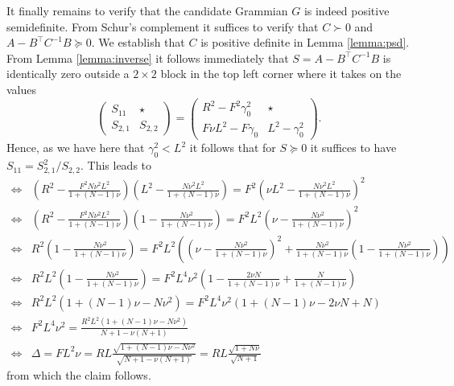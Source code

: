 \documentclass{article}
\begin{document}
\begin{appendixproof}
It finally remains to verify that the candidate Grammian $G$ is indeed positive semidefinite. From Schur's complement it suffices to verify that $C\succ 0$ and $A-B^\top C^{-1} B\succeq 0$. We establish that $C$ is positive definite in Lemma \ref{lemma:psd}. From Lemma \ref{lemma:inverse} it follows immediately that $S = A-B^\top C^{-1} B$ is identically zero outside a $2\times2$ block in the top left corner where it takes on the values
\[
  \begin{pmatrix}
    S_{11} & \star \\
    S_{2, 1} & S_{2,2}
  \end{pmatrix}
  =
  \begin{pmatrix}
    R^2-F^2\gamma_0^2 & \star \\
    F\nu L^2-F\gamma_0 & L^2-\gamma_0^2
  \end{pmatrix}.
\]
Hence, as we have here that $\gamma_0^2<L^2$ it follows that for $S\succeq 0$ it suffices to have $S_{11} = S_{2,1}^2/S_{2,2}$. This leads to
\begin{align*}
  \iff & \left(R^2-\frac{F^2 N \nu^2 L^2}{1+(N-1)\nu}\right)\left(L^2-\frac{N \nu^2 L^2}{1+(N-1)\nu}\right)=F^2 \left( \nu L^2-\frac{N \nu^2 L^2}{1+(N-1)\nu}\right)^2\\
  \iff & \left(R^2-\frac{F^2 N \nu^2 L^2}{1+(N-1)\nu}\right)\left(1-\frac{N \nu^2}{1+(N-1)\nu}\right)=F^2 L^2 \left( \nu -\frac{N \nu^2}{1+(N-1)\nu}\right)^2\\
  \iff &  R^2 \left(1-\frac{N \nu^2}{1+(N-1)\nu}\right)=F^2 L^2 \left(  \left( \nu -\frac{N \nu^2}{1+(N-1)\nu}\right)^2 + \frac{N \nu^2 }{1+(N-1)\nu} \left(1-\frac{N \nu^2}{1+(N-1)\nu}\right) \right)\\
  \iff & R^2 L^2 \left(1-\frac{N \nu^2}{1+(N-1)\nu}\right)=F^2 L^4 \nu^2 \left( 1-\frac{2\nu N}{1+(N-1)\nu}+\frac{N}{1+(N-1)\nu} \right)\\
  \iff & R^2 L^2 \left(1+(N-1)\nu-N \nu^2\right)=F^2 L^4 \nu^2 \left( 1+(N-1)\nu-2\nu N+N \right)\\
  \iff & F^2 L^4 \nu^2 = \frac{R^2L^2 \left(1+(N-1)\nu-N \nu^2\right)}{N+1-\nu(N+1)}\\
  \iff & \Delta = F L^2 \nu = RL \frac{\sqrt{1+(N-1)\nu-N \nu^2}}{\sqrt{N+1-\nu(N+1)}}=RL\frac{\sqrt{1+N\nu}}{\sqrt{N+1}}
\end{align*}
from which the claim follows.
\end{appendixproof}
\end{document}
